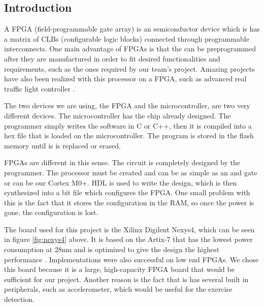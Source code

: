 
\subsection{Introduction}

A FPGA (field-programmable gate array) is an semiconductor device which is has a matrix of CLBs (configurable logic blocks) connected through programmable interconnects. One main advantage of FPGAs is that the can be preprogrammed after they are manufactured in order to fit desired functionalities and requirements, such as the ones required by our team's project. Amazing projects have also been realized with this processor on a FPGA, such as advanced real traffic light controller \cite{traffic_light}.

The two devices we are using, the FPGA and the microcontroller, are two very different devices. The microcontroller has the chip already designed. The programmer simply writes the software in C or C++, then it is compiled into a hex file that is loaded on the microcontroller. The program is stored in the flash memory until is is replaced or erased.

FPGAs are different in this sense. The circuit is completely designed by the programmer. The processor must be created and can be as simple as an and gate or can be our Cortex M0+. HDL is used to write the design, which is then synthesized into a bit file which configures the FPGA. One small problem with this is the fact that it stores the configuration in the RAM, so once the power is gone, the configuration is lost.

The board used for this project is the Xilinx Digilent Nexys4, which can be seen in figure \ref{fig:nexys4} above. It is based on the Artix-7 that has the lowest power consumption at 28nm and is optimized to give the design the highest performance \cite{cortexm0onnexys4}. Implementations were also successful on low end FPGAs. We chose this board because it is a large, high-capacity FPGA board that would be sufficient for our project. Another reason is the fact that is has several built in peripherals, such as accelerometer, which would be useful for the exercise detection. 

